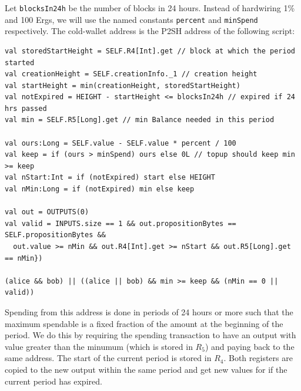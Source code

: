 \documentclass[11pt]{article}
\begin{document}
Let \texttt{blocksIn24h} be the number of blocks in 24 hours. Instead of hardwiring 1\% and 100 Ergs, we will use the named constants \texttt{percent} and \texttt{minSpend} respectively. The cold-wallet address is the P2SH address of the following script:
\begin{verbatim}
val storedStartHeight = SELF.R4[Int].get // block at which the period started
val creationHeight = SELF.creationInfo._1 // creation height
val startHeight = min(creationHeight, storedStartHeight) 
val notExpired = HEIGHT - startHeight <= blocksIn24h // expired if 24 hrs passed
val min = SELF.R5[Long].get // min Balance needed in this period

val ours:Long = SELF.value - SELF.value * percent / 100
val keep = if (ours > minSpend) ours else 0L // topup should keep min >= keep
val nStart:Int = if (notExpired) start else HEIGHT
val nMin:Long = if (notExpired) min else keep

val out = OUTPUTS(0)  
val valid = INPUTS.size == 1 && out.propositionBytes == SELF.propositionBytes &&
  out.value >= nMin && out.R4[Int].get >= nStart && out.R5[Long].get == nMin})
    
(alice && bob) || ((alice || bob) && min >= keep && (nMin == 0 || valid))
\end{verbatim}

Spending from this address is done in periods of 24 hours or more such that the maximum spendable is a fixed fraction of the amount at the beginning of the period. We do this by requiring the spending transaction to have an output with value greater than the minumum (which is stored in $R_5$) and paying back to the same address. The start of the current period is stored in $R_4$. Both registers are copied to the new output within the same period and get new values for if the current period has expired.
\end{document}
